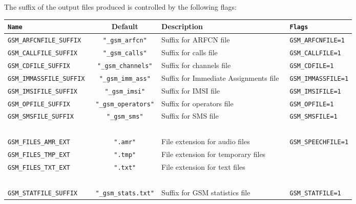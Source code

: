 \documentclass[documentation]{subfiles}
\begin{document}
The suffix of the output files produced is controlled by the following flags:
\begin{longtable}{>{\tt}lcl>{\tt\small}l}
    \toprule
    {\bf Name} & {\bf Default} & {\bf Description} & {\bf Flags}\\
    \midrule\endhead%
    GSM\_ARFCNFILE\_SUFFIX  & {\tt\small "\_gsm\_arfcn"}     & Suffix for ARFCN file                 & GSM\_ARFCNFILE=1 \\
    GSM\_CALLFILE\_SUFFIX   & {\tt\small "\_gsm\_calls"}     & Suffix for calls file                 & GSM\_CALLFILE=1  \\
    GSM\_CDFILE\_SUFFIX     & {\tt\small "\_gsm\_channels"}  & Suffix for channels file              & GSM\_CDFILE=1    \\
    GSM\_IMMASSFILE\_SUFFIX & {\tt\small "\_gsm\_imm\_ass"}  & Suffix for Immediate Assignments file & GSM\_IMMASSFILE=1\\
    GSM\_IMSIFILE\_SUFFIX   & {\tt\small "\_gsm\_imsi"}      & Suffix for IMSI file                  & GSM\_IMSIFILE=1  \\
    GSM\_OPFILE\_SUFFIX     & {\tt\small "\_gsm\_operators"} & Suffix for operators file             & GSM\_OPFILE=1    \\
    GSM\_SMSFILE\_SUFFIX    & {\tt\small "\_gsm\_sms"}       & Suffix for SMS file                   & GSM\_SMSFILE=1   \\
                            &                                &                                       &                  \\
    GSM\_FILES\_AMR\_EXT    & {\tt\small ".amr"}             & File extension for audio files        & GSM\_SPEECHFILE=1\\
    GSM\_FILES\_TMP\_EXT    & {\tt\small ".tmp"}             & File extension for temporary files    &                  \\
    GSM\_FILES\_TXT\_EXT    & {\tt\small ".txt"}             & File extension for text files         &                  \\
                            &                                &                                       &                  \\
    GSM\_STATFILE\_SUFFIX   & {\tt\small "\_gsm\_stats.txt"} & Suffix for GSM statistics file        & GSM\_STATFILE=1  \\
    \bottomrule
\end{longtable}
\end{document}
